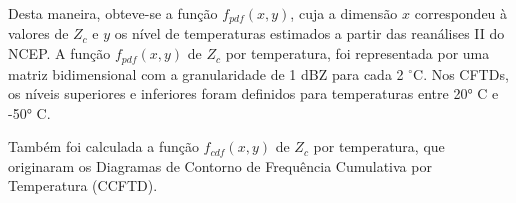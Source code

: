 Desta maneira, obteve-se a função $f_{pdf}(x,y)$, cuja a dimensão $x$ correspondeu à valores de $Z_{c}$ e $y$ os nível de temperaturas estimados a partir das reanálises II do NCEP. A função $f_{pdf}(x,y)$ de $Z_c$ por temperatura, foi representada por uma matriz bidimensional com a granularidade de 1 dBZ para cada 2 $^{\circ}$C. Nos CFTDs, os níveis superiores e inferiores foram definidos para temperaturas entre 20° C e -50° C.


Também foi calculada a função $f_{cdf}(x,y)$ de $Z_c$ por temperatura, que originaram os Diagramas de Contorno de Frequência Cumulativa por Temperatura (CCFTD).     







